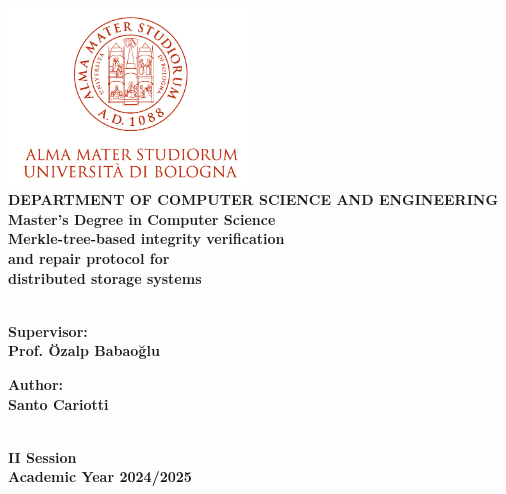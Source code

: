 
\begin{titlepage}
\begin{center}


\includegraphics[width=2.56in]{assets/logo.png}\\[1cm]

{\bfseries DEPARTMENT OF COMPUTER SCIENCE AND ENGINEERING \\ 
Master's Degree in Computer Science } \\[5cm]


{\LARGE \bfseries
Merkle-tree-based integrity verification\\ and repair protocol for\\ distributed storage systems\\[3mm]
} \\[5cm]

\begin{minipage}[t]{0.47\textwidth}
\raggedright
{\large \bfseries Supervisor: \\ Prof. Özalp Babaoğlu}
\end{minipage}
\hfill
\begin{minipage}[t]{0.47\textwidth}
\raggedleft
{\large \bfseries Author: \\ Santo Cariotti}
\end{minipage} \\[3cm]

{\large \bfseries II Session \\ 
Academic Year 2024/2025}

\end{center}
\end{titlepage}

\restoregeometry
